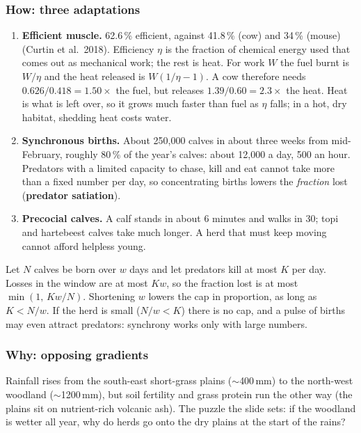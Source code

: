 \subsubsection*{How: three adaptations}
\begin{enumerate}
\item \textbf{Efficient muscle.} 62.6\,\% efficient, against 41.8\,\% (cow) and 34\,\% (mouse) (Curtin et al.\
2018). Efficiency $\eta$ is the fraction of chemical energy used that comes out as mechanical work; the rest is
heat. For work $W$ the fuel burnt is $W/\eta$ and the heat released is $W(1/\eta-1)$. A cow therefore needs
$0.626/0.418=1.50\times$ the fuel, but releases $1.39/0.60=2.3\times$ the heat. Heat is what is left over, so it
grows much faster than fuel as $\eta$ falls; in a hot, dry habitat, shedding heat costs water.
\item \textbf{Synchronous births.} About 250{,}000 calves in about three weeks from mid-February, roughly 80\,\% of the
year's calves: about 12{,}000 a day, 500 an hour. Predators with a limited capacity to chase, kill and eat cannot
take more than a fixed number per day, so concentrating births lowers the \emph{fraction} lost
(\textbf{predator satiation}).
\item \textbf{Precocial calves.} A calf stands in about 6 minutes and walks in 30; topi and hartebeest calves take
much longer. A herd that must keep moving cannot afford helpless young.
\end{enumerate}

\begin{chain}
Let $N$ calves be born over $w$ days and let predators kill at most $K$ per day. Losses in the window are at most
$Kw$, so the fraction lost is at most $\min(1,\,Kw/N)$. Shortening $w$ lowers the cap in proportion, as long as
$K<N/w$. If the herd is small ($N/w<K$) there is no cap, and a pulse of births may even attract predators: synchrony
works only with large numbers.
\end{chain}

\subsubsection*{Why: opposing gradients}
Rainfall rises from the south-east short-grass plains ($\sim$400\,mm) to the north-west woodland ($\sim$1200\,mm),
but soil fertility and grass protein run the other way (the plains sit on nutrient-rich volcanic ash). The puzzle
the slide sets: if the woodland is wetter all year, why do herds go onto the dry plains at the start of the rains?

